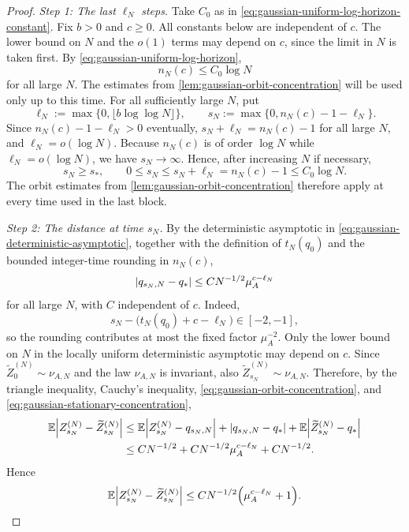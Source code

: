 \documentclass[11pt,reqno,a4paper]{article}
\newcommand{\Ee}{\E}
\begin{document}
\begin{proof}
  \emph{Step 1: The last $\ell_N$ steps.}
  Take $C_0$ as in \cref{eq:gaussian-uniform-log-horizon-constant}. Fix
  $b>0$ and $c\geq0$. All constants below are independent of $c$. The
  lower bound on $N$ and the $o(1)$ terms may depend on $c$, since the limit in
  $N$ is taken first. By
  \cref{eq:gaussian-uniform-log-horizon},
  \begin{equation*}
    n_N(c)\leq C_0\log N
  \end{equation*}
  for all large $N$. The estimates from
  \cref{lem:gaussian-orbit-concentration} will be used only up to this time.
  For all sufficiently large $N$, put
  \begin{equation*}
    \ell_N:=\max\{0,\lfloor b\log\log N\rfloor\},
    \qquad
    s_N:=\max\{0,n_N(c)-1-\ell_N\}.
  \end{equation*}
  Since $n_N(c)-1-\ell_N>0$ eventually,
  $s_N+\ell_N=n_N(c)-1$ for all large $N$, and
  $\ell_N=o(\log N)$.
  Because $n_N(c)$ is of order $\log N$ while
  $\ell_N=o(\log N)$, we have $s_N\to\infty$. Hence, after increasing $N$ if
  necessary,
  \begin{equation*}
    s_N\geq s_\ast,
    \qquad
    0\leq s_N\leq s_N+\ell_N=n_N(c)-1\leq C_0\log N .
  \end{equation*}
  The orbit estimates from \cref{lem:gaussian-orbit-concentration} therefore
  apply at every time used in the last block.

  \emph{Step 2: The distance at time $s_N$.}
  By the deterministic asymptotic in
  \cref{eq:gaussian-deterministic-asymptotic}, together with the definition of
  $t_N(q_0)$ and the bounded integer-time rounding in $n_N(c)$,
  \begin{equation}\label{eq:gaussian-block-deterministic-start}
    \abs{q_{s_N,N}-q_\ast}
    \leq
    C N^{-1/2}\mu_A^{c-\ell_N}
  \end{equation}
  for all large $N$, with $C$ independent of $c$. Indeed,
  \begin{equation*}
    s_N-\bigl(t_N(q_0)+c-\ell_N\bigr)\in[-2,-1],
  \end{equation*}
  so the rounding contributes at most the fixed factor $\mu_A^{-2}$. Only the
  lower bound on $N$ in the locally uniform deterministic asymptotic may depend
  on $c$. Since $\widetilde Z_0^{(N)}\sim\nu_{A,N}$ and the law
  $\nu_{A,N}$ is invariant, also
  $\widetilde Z_{s_N}^{(N)}\sim\nu_{A,N}$. Therefore, by the triangle
  inequality, Cauchy's inequality,
  \cref{eq:gaussian-orbit-concentration}, and
  \cref{eq:gaussian-stationary-concentration},
  \begin{align*}
    \Ee\abs{Z_{s_N}^{(N)}-\widetilde Z_{s_N}^{(N)}}
    &\leq
    \Ee\abs{Z_{s_N}^{(N)}-q_{s_N,N}}
    +
    \abs{q_{s_N,N}-q_\ast}
    +
    \Ee\abs{\widetilde Z_{s_N}^{(N)}-q_\ast}
    \\
    &\leq
    C N^{-1/2}
    +
    C N^{-1/2}\mu_A^{c-\ell_N}
    +
    C N^{-1/2}.
  \end{align*}
  Hence
  \begin{equation}\label{eq:gaussian-block-start-distance}
    \Ee\abs{Z_{s_N}^{(N)}-\widetilde Z_{s_N}^{(N)}}
    \leq
    C N^{-1/2}\left(\mu_A^{c-\ell_N}+1\right).
  \end{equation}


\end{proof}
\end{document}
